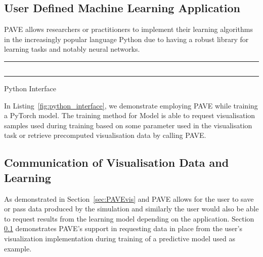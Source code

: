 \subsection{User Defined Machine Learning Application}
\label{sec:PAVElearn}
PAVE allows researchers or practitioners to implement their learning algorithms in the increasingly popular language Python due to having a robust library for learning tasks and notably neural networks. 

\begin{listing}[htb]
\noindent\rule{0.5\textwidth}{1pt}
\inputminted{python}{pave.py}
\noindent\rule{0.5\textwidth}{1pt}
\caption{Python Interface}
\label{fig:python_interface}
\end{listing}

In Listing~\ref{fig:python_interface}, we demonstrate employing PAVE while training a PyTorch model. The training method for Model is able to request visualisation samples used during training based on some parameter used in the visualisation task or retrieve precomputed visualisation data by calling PAVE.
 
\subsection{Communication of Visualisation Data and Learning}

As demonstrated in Section~\ref{sec:PAVEvis} and PAVE allows for the user to save or pass data produced by the simulation and similarly the user would also be able to request results from the learning model depending on the application. Section \ref{sec:PAVElearn} demonstrates PAVE's support in requesting data in place from the user's visualization implementation during training of a predictive model used as example. 
